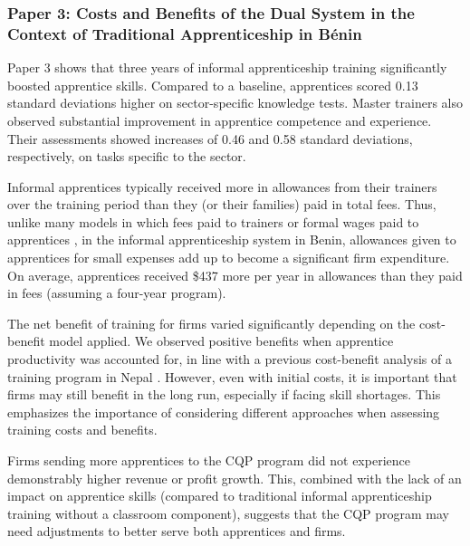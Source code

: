 \documentclass[
  a4paper, twoside, 12pt]{book}
\renewcommand{\hl}[1]{#1}
\begin{document}
\hypertarget{paper-3-costs-and-benefits-of-the-dual-system-in-the-context-of-traditional-apprenticeship-in-buxe9nin}{%
\subsubsection*{Paper 3: Costs and Benefits of the Dual System in the Context of Traditional Apprenticeship in Bénin}\label{paper-3-costs-and-benefits-of-the-dual-system-in-the-context-of-traditional-apprenticeship-in-buxe9nin}}

\hl{Paper 3 shows that three years of informal apprenticeship training significantly boosted apprentice skills. Compared to a baseline, apprentices scored 0.13 standard deviations higher on sector-specific knowledge tests. Master trainers also observed substantial improvement in apprentice competence and experience. Their assessments showed increases of 0.46 and 0.58 standard deviations, respectively, on tasks specific to the sector.}

\hl{Informal apprentices typically received more in allowances from their trainers over the training period than they (or their families) paid in total fees. Thus, unlike many models in which fees paid to trainers or formal wages paid to apprentices} \autocite{velenchik1995}, \hl{in the informal apprenticeship system in Benin, allowances given to apprentices for small expenses add up to become a significant firm expenditure. On average, apprentices received \$437 more per year in allowances than they paid in fees (assuming a four-year program).}

\hl{The net benefit of training for firms varied significantly depending on the cost-benefit model applied. We observed positive benefits when apprentice productivity was accounted for, in line with a previous cost-benefit analysis of a training program in Nepal} \autocite{bolli2020}. \hl{However, even with initial costs, it is important that firms may still benefit in the long run, especially if facing skill shortages. This emphasizes the importance of considering different approaches when assessing training costs and benefits.}

\hl{Firms sending more apprentices to the CQP program did not experience demonstrably higher revenue or profit growth. This, combined with the lack of an impact on apprentice skills (compared to traditional informal apprenticeship training without a classroom component), suggests that the CQP program may need adjustments to better serve both apprentices and firms.}
\end{document}
